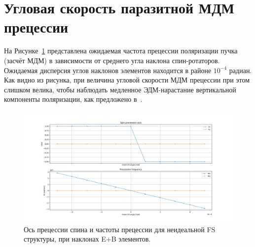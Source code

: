 \documentclass{report}
\begin{document}
\section{Угловая скорость паразитной МДМ прецессии}
На Рисунке~\ref{fig:Linearity_test_shifting_gauss} представлена ожидаемая частота прецессии поляризации пучка (засчёт МДМ) в зависимости от среднего угла наклона спин-ротаторов. Ожидаемая дисперсия углов наклонов элементов находится в районе $10^{-4}$ радиан. Как видно из рисунка, при величина угловой скорости МДМ прецессии при этом слишком велика, чтобы наблюдать медленное ЭДМ-нарастание вертикальной компоненты поляризации, как предложено в~\cite{BNL:Deuteron2008}.
\begin{figure}[H]
  \includegraphics[width=\textwidth]{edm_img/linearity_test_shifting_gauss}
  \caption{Ось прецессии спина и частоты прецессии для неидеальной FS
    структуры, при наклонах E+B элементов.\label{fig:Linearity_test_shifting_gauss}}
\end{figure}
\end{document}
